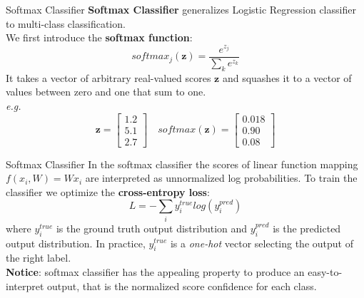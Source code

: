 \documentclass[aspectratio=169]{beamer}
\begin{document}
\begin{frame}{Softmax Classifier}
\textbf{Softmax Classifier} generalizes Logistic Regression classifier to multi-class classification.\\
\vspace{0.2cm}
We first introduce the \textbf{softmax function}:
\begin{equation*}
softmax_j(\textbf{z}) = \frac{e^{z_j}}{\sum_k e^{z_k}}
\end{equation*}
It takes a vector of arbitrary real-valued scores $\textbf{z}$ and squashes it to a vector of values between zero and one that sum to one.\\
\emph{e.g.}
\begin{equation*}
\textbf{z} = \begin{bmatrix}1.2\\5.1\\2.7\end{bmatrix}
\quad softmax(\textbf{z}) = \begin{bmatrix}0.018\\0.90\\0.08\end{bmatrix}
\end{equation*}
\end{frame}


\begin{frame}{Softmax Classifier}
In the softmax classifier the scores of linear function mapping $f(x_i,W) = Wx_i$ are interpreted as unnormalized log probabilities. To train the classifier we optimize the \textbf{cross-entropy loss}:
\begin{equation*}
L = - \sum_i y_i^{true}log(y_i^{pred})
\end{equation*}
where $y_i^{true}$ is the ground truth output distribution and $y_i^{pred}$ is the predicted output distribution. In practice, $y_i^{true}$ is a \textit{one-hot} vector selecting the output of the right label.\\
\vspace{0.2cm}
\textbf{Notice}: softmax classifier has the appealing property to produce an easy-to-interpret output, that is the normalized score confidence for each class.
\end{frame}

\end{document}
